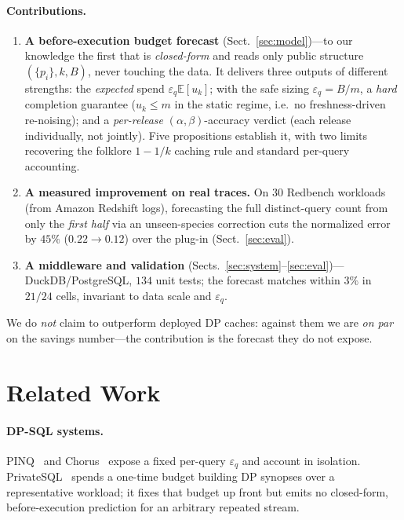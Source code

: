 \documentclass[runningheads]{llncs}
\newcommand{\eps}{\varepsilon}
\newcommand{\E}{\mathbb{E}}
\begin{document}
\paragraph{Contributions.}
\begin{enumerate}
\item \textbf{A before-execution budget forecast} (Sect.~\ref{sec:model})---to our knowledge the first that is \emph{closed-form} and reads only public structure $(\{p_i\},k,B)$, never touching the data. It delivers three outputs of different strengths: the \emph{expected} spend $\eps_q\E[u_k]$; with the safe sizing $\eps_q{=}B/m$, a \emph{hard} completion guarantee ($u_k\le m$ in the static regime, i.e.\ no freshness-driven re-noising); and a \emph{per-release} $(\alpha,\beta)$-accuracy verdict (each release individually, not jointly). Five propositions establish it, with two limits recovering the folklore $1-1/k$ caching rule and standard per-query accounting.
\item \textbf{A measured improvement on real traces.} On $30$ Redbench workloads (from Amazon Redshift logs), forecasting the full distinct-query count from only the \emph{first half} via an unseen-species correction cuts the normalized error by $45\%$ ($0.22\!\to\!0.12$) over the plug-in (Sect.~\ref{sec:eval}).
\item \textbf{A middleware and validation} (Sects.~\ref{sec:system}--\ref{sec:eval})---DuckDB/PostgreSQL, $134$ unit tests; the forecast matches within $3\%$ in $21/24$ cells, invariant to data scale and $\eps_q$.
\end{enumerate}
We do \emph{not} claim to outperform deployed DP caches: against them we are \emph{on par} on the savings number---the contribution is the forecast they do not expose.

\section{Related Work}
\label{sec:related}

\paragraph{DP-SQL systems.} PINQ~\cite{mcsherry2009privacy} and Chorus~\cite{johnson2020chorus} expose a fixed per-query $\eps_q$ and account in isolation. PrivateSQL~\cite{kotsogiannis2019privatesql} spends a one-time budget building DP synopses over a representative workload; it fixes that budget up front but emits no closed-form, before-execution prediction for an arbitrary repeated stream.
\end{document}
